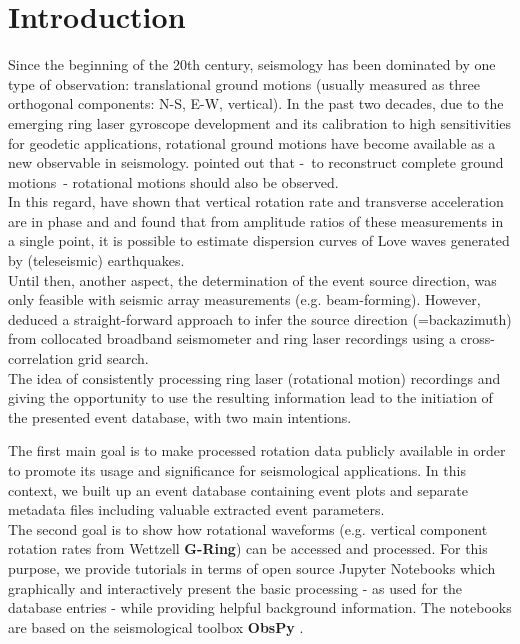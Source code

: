 \documentclass[12pt,reqno,letter]{article} %
\begin{document}
\section{Introduction}
Since the beginning of the 20th century, seismology has been dominated by one type of observation: translational ground motions (usually measured as three orthogonal components: N-S, E-W, vertical). In the past two decades, due to the emerging ring laser gyroscope development and its calibration to high sensitivities \citep{Stedman1995,Stedman1997,Schreiber2003, Schreiber2004} for geodetic applications, rotational ground motions have become available as a new observable in seismology.
\cite{AkiRichards2002} pointed out that -~to reconstruct complete ground motions~- rotational motions should also be observed.
\\ 
In this regard, \cite{McLeod1998, Pancha2000} have shown that vertical rotation rate and transverse acceleration are in phase and \cite{Igel2005,Igel2007} and \cite{Kurrle2010} found that from amplitude ratios of these measurements in a single point, it is possible to estimate dispersion curves of Love waves generated by (teleseismic) earthquakes.\\
Until then, another aspect, the determination of the event source direction, was only feasible with seismic array measurements (e.g. beam-forming). However, \cite{Igel2007} deduced a straight-forward approach to infer the source direction (=backazimuth) from  collocated broadband seismometer and ring laser recordings using a cross-correlation grid search.\\
The idea of consistently processing ring laser (rotational motion) recordings and giving the opportunity to use the resulting information lead to the initiation of the presented event database, with two main intentions.

\noindent
The first main goal is to make processed rotation data publicly available in order to promote its usage and significance for seismological applications. In this context, we built up an event database containing event plots and separate metadata files including valuable extracted event parameters.\\
The second goal is to show how rotational waveforms (e.g. vertical component rotation rates from Wettzell \textbf{G-Ring}) can be accessed and processed. For this purpose, we provide tutorials in terms of open source Jupyter Notebooks \citep{Perez2007} which graphically and interactively present the basic processing - as used for the database entries - while providing helpful background information. The notebooks are based on the seismological toolbox \textbf{ObsPy} \citep{Megies2011,Krischer2015}.
\end{document}

